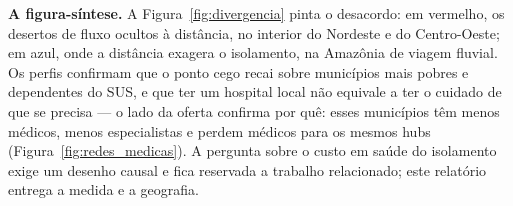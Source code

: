 \medskip
\noindent\textbf{A figura-síntese.} A Figura~\ref{fig:divergencia} pinta o
desacordo: em vermelho, os desertos de fluxo ocultos à distância, no interior do
Nordeste e do Centro-Oeste; em azul, onde a distância exagera o isolamento, na
Amazônia de viagem fluvial. Os perfis confirmam que o ponto cego recai sobre
municípios mais pobres e dependentes do SUS, e que ter um hospital local não
equivale a ter o cuidado de que se precisa --- o lado da oferta confirma por quê:
esses municípios têm menos médicos, menos especialistas e perdem médicos para os
mesmos hubs (Figura~\ref{fig:redes_medicas}). A pergunta sobre o custo em saúde
do isolamento exige um desenho causal e fica reservada a trabalho relacionado;
este relatório entrega a medida e a geografia.
